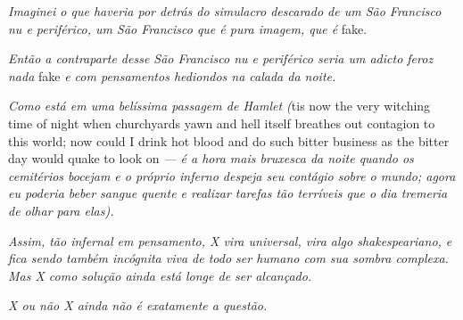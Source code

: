 \emph{Imaginei o que haveria por detrás do simulacro descarado de um São
Francisco nu e periférico, um São Francisco que é pura imagem, que é}
fake.

\emph{Então a contraparte desse São Francisco nu e periférico seria um
adicto feroz nada} fake \emph{e com pensamentos hediondos na calada da noite.}

\emph{Como está em uma belíssima passagem de Hamlet (}tis now the very
witching time of night when churchyards yawn and hell itself breathes
out contagion to this world; now could I drink hot blood and do such
bitter business as the bitter day would quake to look on \emph{--- é a hora mais
bruxesca da noite quando os cemitérios bocejam e o próprio inferno
despeja seu contágio sobre o mundo; agora eu poderia beber sangue quente
e realizar tarefas tão terríveis que o dia tremeria de olhar para elas).}

\emph{Assim, tão infernal em pensamento, X vira universal, vira algo
shakespeariano, e fica sendo também incógnita viva de todo ser humano
com sua sombra complexa. Mas X como solução ainda está longe de ser
alcançado.}

\emph{X ou não X ainda não é exatamente a questão.~}
\endgroup